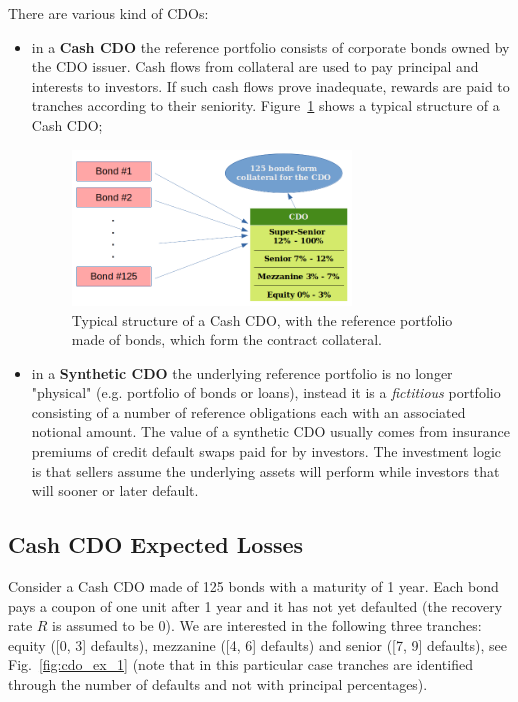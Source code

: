 There are various kind of CDOs:
\begin{itemize}
\item in a \textbf{Cash CDO} the reference portfolio consists of corporate bonds owned by the CDO issuer. Cash flows from collateral are used to pay principal and interests to investors. If such cash flows prove inadequate, rewards are paid to tranches according to their seniority. Figure~\ref{fig:cdo_structure} shows a typical structure of a Cash CDO;

\begin{figure}[htb]
\centering
\includegraphics[width=0.7\textwidth]{figures/cdo_structure}
\caption{Typical structure of a Cash CDO, with the reference portfolio made of bonds, which form the contract collateral.}
\label{fig:cdo_structure}
\end{figure}

\item in a \textbf{Synthetic CDO} the underlying reference portfolio is no longer "physical" (e.g. portfolio of bonds or loans), instead it is a \emph{fictitious} portfolio consisting of a number of reference obligations each with an associated notional amount. The value of a synthetic CDO usually comes from insurance premiums of credit default swaps paid for by investors. The investment logic is that sellers assume the underlying assets will perform while investors that will sooner or later default.
\end{itemize}

\subsection{Cash CDO Expected Losses}
\label{sec:expected_losses}

Consider a Cash CDO made of 125 bonds with a maturity of 1 year. Each bond pays a coupon of one unit after 1 year and it has not yet defaulted (the recovery rate $R$ is assumed to be 0). We are interested in the following three tranches: equity ([0, 3] defaults), mezzanine ([4, 6] defaults) and senior ([7, 9] defaults), see Fig.~\ref{fig:cdo_ex_1} (note that in this particular case tranches are identified through the number of defaults and not with principal percentages). 

